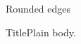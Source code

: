 \documentclass[17pt]{beamer}
\begin{document}
\begin{frame}[t]{Rounded edges}
\begin{block}{Title}Plain body.\end{block}
\end{frame}
\end{document}
